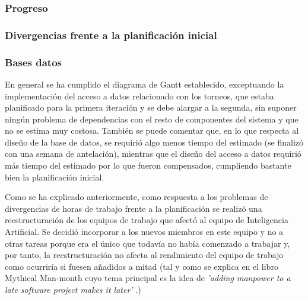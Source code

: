 \subsubsection{Progreso}
\subsubsection*{Divergencias frente a la planificación inicial}
\subsubsection*{Bases datos}
En general se ha cumplido el diagrama de Gantt establecido, exceptuando la implementación del acceso a datos relacionado con los torneos, que estaba planificado para la primera iteración y se debe alargar a la segunda, sin suponer ningún problema de dependencias con el resto de componentes del sistema y que no se estima muy costosa. También se puede comentar que, en lo que respecta al diseño de la base de datos, se requirió algo menos tiempo del estimado (se finalizó con una semana de antelación), mientras que el diseño del acceso a datos requirió más tiempo del estimado por lo que fueron compensados, cumpliendo bastante bien la planificación inicial.

Como se ha explicado anteriormente, como respuesta a los problemas de divergencias de horas de trabajo frente a la planificación se realizó una reestructuración de los equipos de trabajo que afectó al equipo de Inteligencia Artificial. Se decidió incorporar a los nuevos miembros en este equipo y no a otras tareas porque era el único que todavía no había comenzado a trabajar y, por tanto, la reestructuración no afecta al rendimiento del equipo de trabajo como ocurriría si fuesen añadidos a mitad (tal y como se explica en el libro Mythical Man-month cuyo tema principal es la idea de \textit{'adding manpower to a late software project makes it later'} \cite{libroMMM}.)
